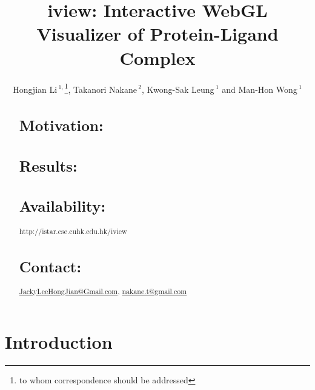 \documentclass{bioinfo}
\begin{document}

\title[iview]{iview: Interactive WebGL Visualizer of Protein-Ligand Complex}
\author[Hongjian Li \textit{et~al}]{Hongjian Li\,$^{1,}$\footnote{to whom correspondence should be addressed}, Takanori Nakane\,$^{2}$, Kwong-Sak Leung\,$^{1}$ and Man-Hon Wong\,$^{1}$}
\address{$^{1}$Department of Computer Science and Engineering, Chinese University of Hong Kong, Hong Kong\\
$^{2}$Graduate School of Medicine, Kyoto University, Japan}



\maketitle

\begin{abstract}

\section{Motivation:}

\section{Results:}

\section{Availability:}
http://istar.cse.cuhk.edu.hk/iview

\section{Contact:} \href{JackyLeeHongJian@Gmail.com}{JackyLeeHongJian@Gmail.com}, \href{nakane.t@gmail.com}{nakane.t@gmail.com}
\end{abstract}

\section{Introduction}
\end{document}
